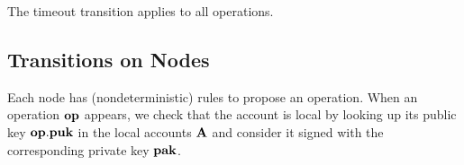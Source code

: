 \documentclass[a4paper]{llncs}
\begin{document}
\begin{mathpar}
\end{mathpar}

The timeout transition applies to all operations.
\begin{mathpar}
\end{mathpar}



\subsection{Transitions on Nodes}
\label{sec:transitions-nodes}

Each node has (nondeterministic) rules to propose an operation.
When an operation $\OP$ appears, we check that the account is local by
looking up its public key $\OP.\PUK$ in the local accounts $\ACCOUNTS$ and
consider it signed with the corresponding private key $\PAK$.
\end{document}
